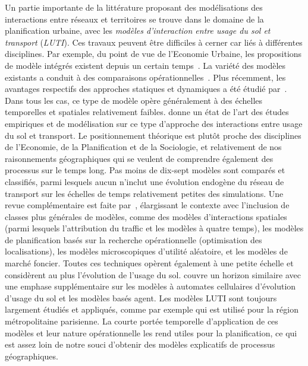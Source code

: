 {Un partie importante de la littérature proposant des modélisations des interactions entre réseaux et territoires se trouve dans le domaine de la planification urbaine, avec les \emph{modèles d'interaction entre usage du sol et transport} (\emph{LUTI}). Ces travaux peuvent être difficiles à cerner car liés à différentes disciplines. Par exemple, du point de vue de l'Economie Urbaine, les propositions de modèle intégrés existent depuis un certain temps~\cite{putman1975urban}. La variété des modèles existants a conduit à des comparaisons opérationnelles~\cite{paulley1991overview,wegener1991one}. Plus récemment, les avantages respectifs des approches statiques et dynamiques a été étudié par~\cite{kryvobokov2013comparison}. Dans tous les cas, ce type de modèle opère généralement à des échelles temporelles et spatiales relativement faibles.  \cite{wegener2004land} donne un état de l'art des études empiriques et de modélisation sur ce type d'approche des interactions entre usage du sol et transport. Le positionnement théorique est plutôt proche des disciplines de l'Economie, de la Planification et de la Sociologie, et relativement de nos raisonnements géographiques qui se veulent de comprendre également des processus sur le temps long. Pas moins de dix-sept modèles sont comparés et classifiés, parmi lesquels aucun n'inclut une évolution endogène du réseau de transport sur les échelles de temps relativement petites des simulations. Une revue complémentaire est faite par~\cite{chang2006models}, élargissant le contexte avec l'inclusion de classes plus générales de modèles, comme des modèles d'interactions spatiales (parmi lesquels l'attribution du traffic et les modèles à quatre temps), les modèles de planification basés sur la recherche opérationnelle (optimisation des localisations), les modèles microscopiques d'utilité aléatoire, et les modèles de marché foncier. Toutes ces techniques opèrent également à une petite échelle et considèrent au plus l'évolution de l'usage du sol. \cite{iacono2008models} couvre un horizon similaire avec une emphase supplémentaire sur les modèles à automates cellulaires d'évolution d'usage du sol et les modèles basés agent. Les modèles LUTI sont toujours largement étudiés et appliqués, comme par exemple \cite{delons:hal-00319087} qui est utilisé pour la région métropolitaine parisienne. La courte portée temporelle d'application de ces modèles et leur nature opérationnelle les rend utiles pour la planification, ce qui est assez loin de notre souci d'obtenir des modèles explicatifs de processus géographiques.
}




